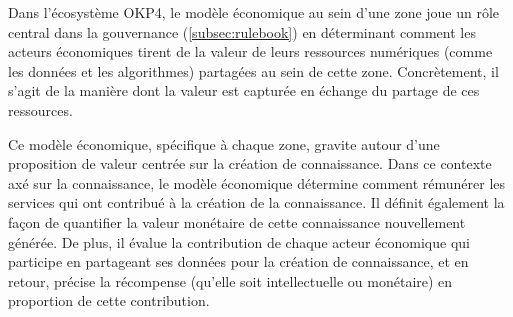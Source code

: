 Dans l'écosystème OKP4, le modèle économique au sein d'une zone joue un rôle central dans la gouvernance (\ref{subsec:rulebook}) en déterminant comment les acteurs économiques tirent de la valeur de leurs ressources numériques (comme les données et les algorithmes) partagées au sein de cette zone. Concrètement, il s'agit de la manière dont la valeur est capturée en échange du partage de ces ressources.

Ce modèle économique, spécifique à chaque zone, gravite autour d'une proposition de valeur centrée sur la création de connaissance. Dans ce contexte axé sur la connaissance, le modèle économique détermine comment rémunérer les services qui ont contribué à la création de la connaissance. Il définit également la façon de quantifier la valeur monétaire de cette connaissance nouvellement générée. De plus, il évalue la contribution de chaque acteur économique qui participe en partageant ses données pour la création de connaissance, et en retour, précise la récompense (qu'elle soit intellectuelle ou monétaire) en proportion de cette contribution.


